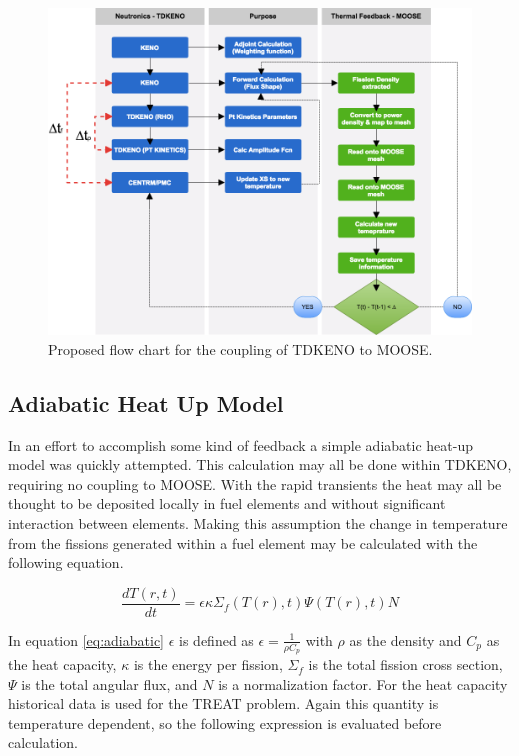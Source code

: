 \documentclass[11pt]{article}
\begin{document}
\begin{figure}[h]
    \centering
    \includegraphics[width=16cm]{figures/flowcharttdk.png}
    \caption{Proposed flow chart for the coupling of TDKENO to MOOSE.}
    \label{fig:flow}
\end{figure}

\subsection{Adiabatic Heat Up Model}

In an effort to accomplish some kind of feedback a simple adiabatic heat-up model was quickly attempted.  This calculation may all be done within TDKENO, requiring no coupling to MOOSE.  With the rapid transients the heat may all be thought to be deposited locally in fuel elements and without significant interaction between elements.  Making this assumption the change in temperature from the fissions generated within a fuel element may be calculated with the following equation.

\begin{equation}
    \frac{dT(r,t)}{dt} = \epsilon \kappa \Sigma_f(T(r),t) \Psi(T(r),t) N
    \label{eq:adiabatic}
\end{equation}

In equation \ref{eq:adiabatic} $\epsilon$ is defined as $\epsilon = \frac{1}{\rho C_p}$ with $\rho$ as the density and $C_p$ as the heat capacity, $\kappa$ is the energy per fission, $\Sigma_f$ is the total fission cross section, $\Psi$ is the total angular flux, and $N$ is a normalization factor. For the heat capacity historical data is used for the TREAT problem.  Again this quantity is temperature dependent, so the following expression is evaluated before calculation.
\end{document}
